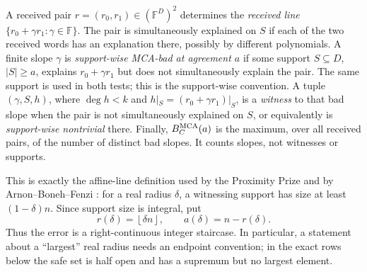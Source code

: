 \documentclass[11pt,a4paper]{amsart}
\numberwithin{equation}{section}
\theoremstyle{remark}
\newcommand{\F}{\mathbb F}
\newcommand{\abs}[1]{\lvert #1\rvert}
\newcommand{\floor}[1]{\left\lfloor #1\right\rfloor}
\begin{document}
A received pair \(r=(r_0,r_1)\in(\F^D)^2\) determines the
\emph{received line} \(\{r_0+\gamma r_1:\gamma\in\F\}\).  The pair is
simultaneously explained on \(S\) if each of the two received words has an explanation
there, possibly by different polynomials.  A finite slope \(\gamma\) is
\emph{support-wise MCA-bad at agreement \(a\)} if some support
\(S\subseteq D\), \(\abs S\ge a\), explains
\(r_0+\gamma r_1\) but does not simultaneously explain the pair.  The
same support is used in both tests; this is the support-wise convention.
A tuple \((\gamma,S,h)\), where \(\deg h<k\) and
\(h|_S=(r_0+\gamma r_1)|_S\), is a \emph{witness} to that bad slope when
the pair is not simultaneously explained on \(S\), or equivalently is
\emph{support-wise nontrivial} there.  Finally,
\(B_C^{\rm MCA}(a)\) is the maximum, over all received pairs, of the
number of distinct bad slopes.  It counts slopes, not witnesses or
supports.

This is exactly the affine-line definition used by the Proximity Prize
\cite{ProximityPrize} and by Arnon--Boneh--Fenzi
\cite[Definition~4.3]{ABF26}: for a real radius \(\delta\), a witnessing
support has size at least \((1-\delta)n\).  Since support size is integral,
put
\[
 r(\delta)=\floor{\delta n},\qquad a(\delta)=n-r(\delta).
\]
Thus the error is a right-continuous integer staircase.  In particular, a
statement about a ``largest'' real radius needs an endpoint convention;
in the exact rows below the safe set is half open and has a supremum but no
largest element.
\end{document}
